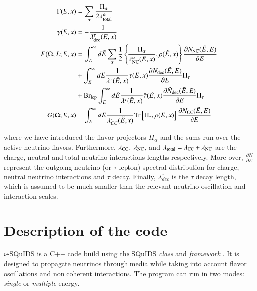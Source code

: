 \documentclass[3p,12pt,authoryear]{elsarticle}
\newcommand{\ttf}{\ttfamily}
\newcommand{\pa}[2]{\frac{\partial #1}{\partial #2}}
\begin{document}
\begin{subequations}
\label{eq:terms}
\begin{align}
\Gamma(E,x) &= \sum_\alpha \frac{\Pi_\alpha}{2 \lambda^\alpha_{\rm total}} \label{eq:gammarho}  \\
\gamma(E,x) &= - \frac{1}{\lambda^\tau_{\rm dec} (E,x)} \\
F(\Omega,L;E,x) &= \int_E^\infty d\tilde{E} \sum_\alpha \frac{1}{2} \left\{ \frac{\Pi_\alpha}{\lambda^\alpha_{\rm NC}(\tilde{E},x)}, \rho(\tilde{E},x) \right\} \pa{N_{\rm NC} (\tilde{E},E)}{E} \label{eq:intro} \\
			   &  + \int_E^\infty d\tilde{E} \frac{1}{\lambda^\tau (\tilde{E},x)}  \tau(\tilde{E},x) \pa{N_{\rm dec} (\tilde{E},E)}{E} \Pi_\tau \nonumber \\
			   &  + {\rm Br}_{\rm lep} \int_E^\infty d\tilde{E} \frac{1}{\lambda^\tau (\tilde{E},x)}  \tilde{\tau}(\tilde{E},x) \pa{\tilde{N}_{\rm dec} (\tilde{E},E)}{E} \Pi_\tau \nonumber \\
G(\Omega;E,x) &=\int_E^\infty d\tilde{E} \frac{1}{\lambda^\tau_{CC} (\tilde{E},x)}  {\rm Tr}\left[\Pi_\tau, \rho(\tilde{E},x) \right] \pa{N_{\rm CC} (\tilde{E},E)}{E} \label{eq:intscalar}
\end{align}
\end{subequations}

where we have introduced the flavor projectors $\Pi_\alpha$ and the sums run over the active neutrino flavors. Furthermore, $\lambda_{\rm CC}$, $\lambda_{\rm NC}$, and $\lambda_{\rm total} = \lambda_{\rm CC} +\lambda_{\rm NC}$ are the charge, neutral and total neutrino interactions lengths respectively. More over, $\pa{N}{E}$ represent the outgoing neutrino (or $\tau$ lepton) spectral distribution for charge, neutral neutrino interactions and $\tau$ decay. Finally, $\lambda^\tau_{dec}$ is the $\tau$ decay length, which is assumed to be much smaller than the relevant neutrino oscillation and interaction scales.

\section{Description of the code} 
\label{sec:code} 

$\nu$-SQuIDS is a {\ttf C++} code build using the SQuIDS {\it class} and {\it framework} \citep{SQUIDS}. It is designed to propagate neutrinos through media while taking into account flavor oscillations and non coherent interactions. The program can run in two modes: {\it single} or {\it multiple} energy. 
\end{document}
